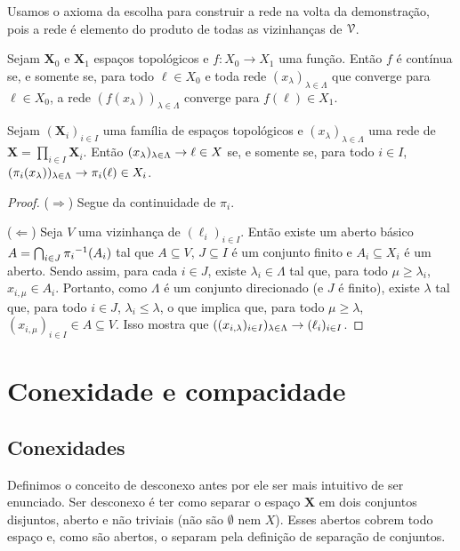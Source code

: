 Usamos o axioma da escolha para construir a rede na volta da demonstração, pois a rede é elemento do produto de todas as vizinhanças de $\mathcal{V}$.

\begin{proposition}
Sejam $\bm X_0$ e $\bm X_1$ espaços topológicos e $f: X_0 \to X_1$ uma função. Então $f$ é contínua se, e somente se, para todo $\ell \in X_0$ e toda rede $(x_\lambda)_{\lambda \in \Lambda}$ que converge para $\ell \in X_0$, a rede $(f(x_\lambda))_{\lambda \in \Lambda}$ converge para $f(\ell) \in X_1$.
\end{proposition}

\begin{proposition}
Sejam $(\bm X_i)_{i \in I}$ uma família de espaços topológicos e $(x_\lambda)_{\lambda \in \Lambda}$ uma rede de $\bm X = \prod_{i \in I} \bm X_i$. Então $(x_\lambda)_{\lambda \in \Lambda} \rightarrow \ell \in X$ se, e somente se, para todo $i \in I$, $(\pi_i(x_\lambda))_{\lambda \in \Lambda} \rightarrow \pi_i(\ell) \in X_i$.
\end{proposition}
\begin{proof} \hfill

($\Rightarrow$) Segue da continuidade de $\pi_i$.

($\Leftarrow$) Seja $V$ uma vizinhança de $(\ell_i)_{i \in I}$. Então existe um aberto básico $A = \bigcap_{i \in J} {\pi_i}^{-1}(A_i)$ tal que $A \subseteq V$, $J \subseteq I$ é um conjunto finito e $A_i \subseteq X_i$ é um aberto. Sendo assim, para cada $i \in J$, existe $\lambda_i \in \Lambda$ tal que, para todo $\mu \geq \lambda_i$, $x_{i,\mu} \in A_i$. Portanto, como $\Lambda$ é um conjunto direcionado (e $J$ é finito), existe $\lambda$ tal que, para todo $i \in J$, $\lambda_i \leq \lambda$, o que implica que, para todo $\mu \geq \lambda$, $(x_{i,\mu})_{i \in I} \in A \subseteq V$. Isso mostra que $((x_{i,\lambda})_{i \in I})_{\lambda \in \Lambda} \rightarrow (\ell_i)_{i \in I}$.
\end{proof}




\section{Conexidade e compacidade}

\subsection{Conexidades}

Definimos o conceito de desconexo antes por ele ser mais intuitivo de ser enunciado. Ser desconexo é ter como separar o espaço $\bm X$ em dois conjuntos disjuntos, aberto e não triviais (não são $\emptyset$ nem $X$). Esses abertos cobrem todo espaço e, como são abertos, o separam pela definição de separação de conjuntos.

